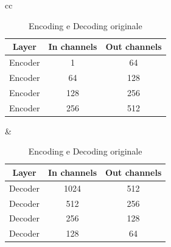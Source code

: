 \begin{table}[!ht]
	\begin{adjustbox}{width=\columnwidth,center}
		\begin{tabular}{cc}
			\begin{tabular}{|c|c|c|}
				\hline
				\textbf{Layer} & \textbf{In channels} & \textbf{Out channels} \\
				\hline
				\hline
				Encoder        & 1                    & 64                    \\
				\hline
				Encoder        & 64                   & 128                   \\
				\hline
				Encoder        & 128                  & 256                   \\
				\hline
				Encoder        & 256                  & 512                   \\
				\hline
			\end{tabular}
			 &
			\begin{tabular}{|c|c|c|}
				\hline
				\textbf{Layer} & \textbf{In channels} & \textbf{Out channels} \\
				\hline
				\hline
				Decoder        & 1024                 & 512                   \\
				\hline
				Decoder        & 512                  & 256                   \\
				\hline
				Decoder        & 256                  & 128                   \\
				\hline
				Decoder        & 128                  & 64                    \\
				\hline
			\end{tabular} \\
		\end{tabular}
	\end{adjustbox}
	\caption{Encoding e Decoding originale}
	\label{tab:encoding_originale}
\end{table}

